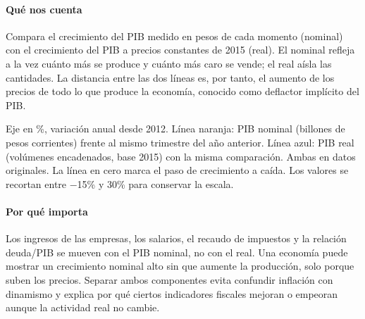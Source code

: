 \paragraph{Qué nos cuenta}
Compara el crecimiento del PIB medido en pesos de cada momento (nominal) con el crecimiento del PIB a precios constantes de 2015 (real). El nominal refleja a la vez cuánto más se produce y cuánto más caro se vende; el real aísla las cantidades. La distancia entre las dos líneas es, por tanto, el aumento de los precios de todo lo que produce la economía, conocido como deflactor implícito del PIB.

\begin{leer}
Eje en \%, variación anual desde 2012. Línea naranja: PIB nominal (billones de pesos corrientes) frente al mismo trimestre del año anterior. Línea azul: PIB real (volúmenes encadenados, base 2015) con la misma comparación. Ambas en datos originales. La línea en cero marca el paso de crecimiento a caída. Los valores se recortan entre −15\% y 30\% para conservar la escala.
\end{leer}

\paragraph{Por qué importa}
Los ingresos de las empresas, los salarios, el recaudo de impuestos y la relación deuda/PIB se mueven con el PIB nominal, no con el real. Una economía puede mostrar un crecimiento nominal alto sin que aumente la producción, solo porque suben los precios. Separar ambos componentes evita confundir inflación con dinamismo y explica por qué ciertos indicadores fiscales mejoran o empeoran aunque la actividad real no cambie.

